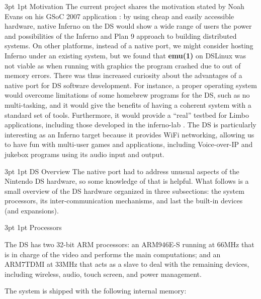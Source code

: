 \documentclass[11pt]{p9article}
\makeatletter
\renewcommand\section{\@startsection {section}{1}{\z@} {3pt} {1pt}
{\normalfont\normalsize\bfseries}}
\renewcommand\subsection{\@startsection {subsection}{1}{\z@} {3pt}
{1pt} {\normalfont\normalsize\bfseries}}
\makeatother
\begin{document}
\subsection{Motivation}
The current project shares the motivation stated by Noah Evans on his GSoC 2007 application \cite{gsoc2007}:
by using cheap and easily accessible hardware, native
Inferno on the DS would show a wide range of users the power and possibilities of the Inferno and Plan 9 approach to building distributed systems.
On other platforms, instead of a native port, we might consider hosting Inferno under an existing system,
but we found that \textbf{emu(1)} on DSLinux \cite{DSLinux} was not viable
as when running with graphics the program crashed due to out of memory errors.
There was thus increased curiosity about the advantages of a native port for DS software development.
For instance, a proper operating system would overcome limitations of some homebrew programs for the DS,
such as no multi-tasking, and it would give the benefits of having a coherent system with a standard set of tools.
Furthermore, it would provide a ``real'' testbed for Limbo applications,
including those developed in the inferno-lab \cite{caerwyn-ipn}.
The DS is particularly interesting as an Inferno target because it provides WiFi networking,
allowing us to have fun with multi-user games and applications,
including Voice-over-IP and jukebox programs using its audio input and output.

\section{DS Overview}
The native port had to address unusual aspects of the Nintendo DS hardware,
so some knowledge of that is helpful.
What follows is a small overview of the DS hardware
organized in three subsections: the system processors,
its inter-communication mechanisms, and last the built-in devices (and expansions).

\subsection{Processors}

The DS has two 32-bit ARM \cite{arm7tdmi} processors: an ARM946E-S running at 66MHz
that is in charge of the video and performs the main computations;
and an ARM7TDMI at 33MHz that acts as a slave to deal with the remaining devices, including
wireless, audio, touch screen, and power management.

The system is shipped with the following internal memory:
\end{document}
